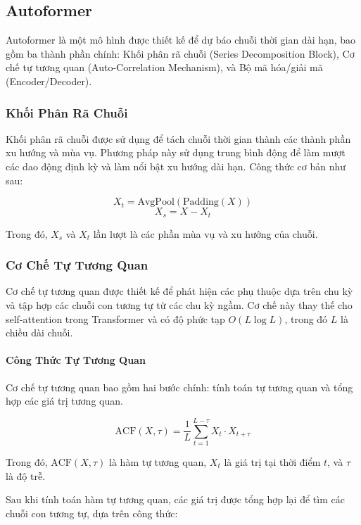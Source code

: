 \subsection{Autoformer}

Autoformer là một mô hình được thiết kế để dự báo chuỗi thời gian dài hạn, bao gồm ba thành phần chính: Khối phân rã chuỗi (Series Decomposition Block), Cơ chế tự tương quan (Auto-Correlation Mechanism), và Bộ mã hóa/giải mã (Encoder/Decoder).

\subsubsection{Khối Phân Rã Chuỗi}

Khối phân rã chuỗi được sử dụng để tách chuỗi thời gian thành các thành phần xu hướng và mùa vụ. Phương pháp này sử dụng trung bình động để làm mượt các dao động định kỳ và làm nổi bật xu hướng dài hạn. Công thức cơ bản như sau:

\[
X_t = \text{AvgPool}(\text{Padding}(X))
\]
\[
X_s = X - X_t
\]

Trong đó, \(X_s\) và \(X_t\) lần lượt là các phần mùa vụ và xu hướng của chuỗi.

\subsubsection{Cơ Chế Tự Tương Quan}

Cơ chế tự tương quan được thiết kế để phát hiện các phụ thuộc dựa trên chu kỳ và tập hợp các chuỗi con tương tự từ các chu kỳ ngầm. Cơ chế này thay thế cho self-attention trong Transformer và có độ phức tạp \(O(L \log L)\), trong đó \(L\) là chiều dài chuỗi.

\paragraph{Công Thức Tự Tương Quan}

Cơ chế tự tương quan bao gồm hai bước chính: tính toán tự tương quan và tổng hợp các giá trị tương quan.

\[
\text{ACF}(X, \tau) = \frac{1}{L} \sum_{t=1}^{L-\tau} X_t \cdot X_{t+\tau}
\]

Trong đó, \(\text{ACF}(X, \tau)\) là hàm tự tương quan, \(X_t\) là giá trị tại thời điểm \(t\), và \(\tau\) là độ trễ.

Sau khi tính toán hàm tự tương quan, các giá trị được tổng hợp lại để tìm các chuỗi con tương tự, dựa trên công thức:

